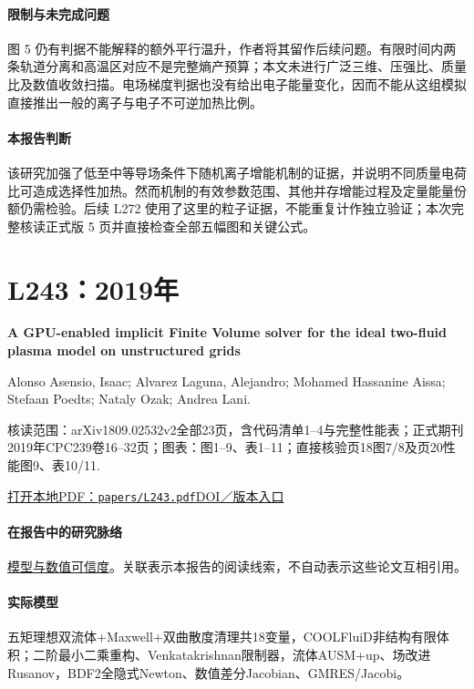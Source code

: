 \documentclass[UTF8,a4paper,11pt,openany,fontset=fandol]{ctexbook}
\begin{document}
\paragraph{限制与未完成问题}图 5 仍有判据不能解释的额外平行温升，作者将其留作后续问题。有限时间内两条轨道分离和高温区对应不是完整熵产预算；本文未进行广泛三维、压强比、质量比及数值收敛扫描。电场梯度判据也没有给出电子能量变化，因而不能从这组模拟直接推出一般的离子与电子不可逆加热比例。

\paragraph{本报告判断}该研究加强了低至中等导场条件下随机离子增能机制的证据，并说明不同质量电荷比可造成选择性加热。然而机制的有效参数范围、其他并存增能过程及定量能量份额仍需检验。后续 L272 使用了这里的粒子证据，不能重复计作独立验证；本次完整核读正式版 5 页并直接检查全部五幅图和关键公式。

\section{L243：2019年}\label{paper:L243}

\textbf{A GPU-enabled implicit Finite Volume solver for the ideal two-fluid plasma model on unstructured grids}\citep{L243}\

Alonso Asensio,  Isaac;  Alvarez Laguna,  Alejandro;  Mohamed Hassanine Aissa;  Stefaan Poedts;  Nataly Ozak;  Andrea Lani.

\textsf{核读范围：}arXiv1809.02532v2全部23页，含代码清单1–4与完整性能表；正式期刊2019年CPC239卷16–32页；\textsf{图表：}图1–9、表1–11；直接核验页18图7/8及页20性能图9、表10/11.

\href{run:../papers/L243.pdf}{打开本地PDF：\texttt{papers/L243.pdf}}\quad\href{https://doi.org/10.1016/j.cpc.2019.01.019}{DOI／版本入口}

\paragraph{在报告中的研究脉络}\hyperref[V1-ch:numerics]{模型与数值可信度}。关联表示本报告的阅读线索，不自动表示这些论文互相引用。

\paragraph{实际模型}五矩理想双流体+Maxwell+双曲散度清理共18变量，COOLFluiD非结构有限体积；二阶最小二乘重构、Venkatakrishnan限制器，流体AUSM+up、场改进Rusanov，BDF2全隐式Newton、数值差分Jacobian、GMRES/Jacobi。
\end{document}
